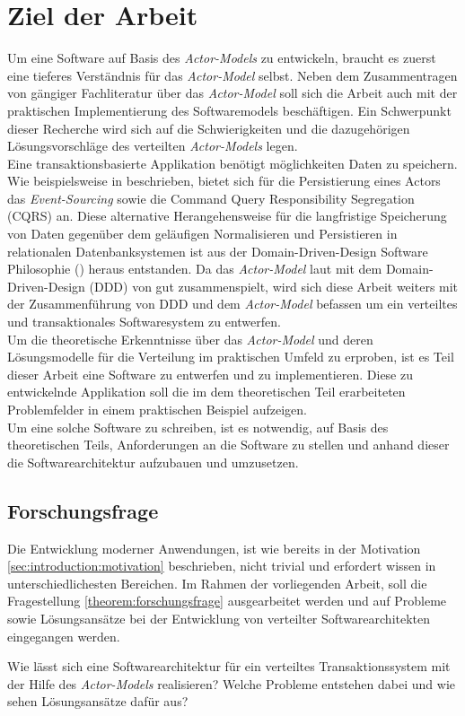 \section{Ziel der Arbeit}\label{sec:introduction:workGoal}
Um eine Software auf Basis des \textit{Actor-Models} zu entwickeln, braucht es zuerst eine tieferes Verständnis für das \textit{Actor-Model}  selbst.  Neben dem Zusammentragen  von gängiger Fachliteratur über das \textit{Actor-Model} soll sich die Arbeit auch mit der praktischen Implementierung des Softwaremodels beschäftigen. Ein Schwerpunkt dieser Recherche wird sich auf die Schwierigkeiten und die dazugehörigen Lösungsvorschläge des verteilten \textit{Actor-Models}  legen. \\
Eine transaktionsbasierte Applikation benötigt möglichkeiten Daten zu speichern. Wie beispielsweise in \cite{Vernon2015ReactiveAkka} beschrieben, bietet sich für die Persistierung eines Actors das \textit{Event-Sourcing} sowie die {Command Query Responsibility Segregation (CQRS)} an. Diese alternative Herangehensweise für die langfristige Speicherung von Daten gegenüber dem geläufigen Normalisieren und Persistieren in relationalen Datenbanksystemen ist aus der Domain-Driven-Design Software Philosophie (\cite{Evans2004Domain-drivenSoftware}) heraus  entstanden. Da das \textit{Actor-Model} laut \cite{Vernon2015ReactiveAkka} mit dem {Domain-Driven-Design} (DDD) von \citep{Evans2004Domain-drivenSoftware} gut zusammenspielt, wird sich diese Arbeit weiters mit der Zusammenführung von DDD und dem \textit{Actor-Model}  befassen um ein verteiltes und transaktionales Softwaresystem zu entwerfen. \\
Um die theoretische Erkenntnisse über das \textit{Actor-Model}  und deren Lösungsmodelle für die Verteilung im praktischen Umfeld zu erproben, ist es Teil dieser Arbeit eine Software zu entwerfen und zu implementieren. Diese zu entwickelnde Applikation soll die im dem theoretischen Teil erarbeiteten Problemfelder in einem praktischen Beispiel aufzeigen. \\
Um eine solche Software zu schreiben, ist es notwendig, auf Basis des theoretischen Teils, Anforderungen an die Software zu stellen und anhand dieser die Softwarearchitektur aufzubauen und umzusetzen. 

\subsection{Forschungsfrage}\label{sec:introduction:forschungsfrage}
Die Entwicklung moderner Anwendungen, ist wie bereits in der Motivation \ref{sec:introduction:motivation} beschrieben, nicht trivial und erfordert wissen in unterschiedlichesten Bereichen. Im Rahmen der vorliegenden Arbeit, soll die Fragestellung \ref{theorem:forschungsfrage} ausgearbeitet werden und auf Probleme sowie Lösungsansätze bei der Entwicklung von verteilter Softwarearchitekten eingegangen werden.
\begin{Theorem}
\label{theorem:forschungsfrage}
Wie lässt sich eine Softwarearchitektur für ein verteiltes Transaktionssystem mit der Hilfe des \textit{Actor-Models} realisieren? Welche Probleme entstehen dabei und wie sehen Lösungsansätze dafür aus?
\end{Theorem}

